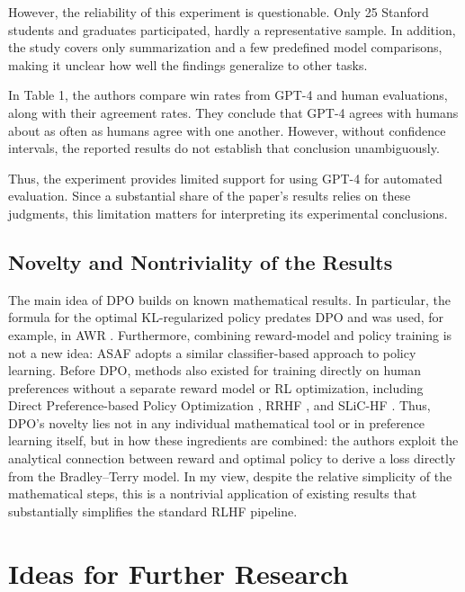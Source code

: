 \documentclass[11pt,a4paper]{article}
\theoremstyle{remark}
\begin{document}
However, the reliability of this experiment is questionable. Only 25 Stanford students and graduates participated, hardly a representative sample. In addition, the study covers only summarization and a few predefined model comparisons, making it unclear how well the findings generalize to other tasks.

In Table 1, the authors compare win rates from GPT-4 and human evaluations, along with their agreement rates. They conclude that GPT-4 agrees with humans about as often as humans agree with one another. However, without confidence intervals, the reported results do not establish that conclusion unambiguously.

Thus, the experiment provides limited support for using GPT-4 for automated evaluation. Since a substantial share of the paper's results relies on these judgments, this limitation matters for interpreting its experimental conclusions.

\subsection{Novelty and Nontriviality of the Results}

The main idea of DPO builds on known mathematical results. In particular, the formula for the optimal KL-regularized policy predates DPO and was used, for example, in AWR \cite{awr}. Furthermore, combining reward-model and policy training is not a new idea: ASAF \cite{asaf} adopts a similar classifier-based approach to policy learning. Before DPO, methods also existed for training directly on human preferences without a separate reward model or RL optimization, including Direct Preference-based Policy Optimization \cite{an2023}, RRHF \cite{rrhf}, and SLiC-HF \cite{slic-hf}. Thus, DPO's novelty lies not in any individual mathematical tool or in preference learning itself, but in how these ingredients are combined: the authors exploit the analytical connection between reward and optimal policy to derive a loss directly from the Bradley--Terry model. In my view, despite the relative simplicity of the mathematical steps, this is a nontrivial application of existing results that substantially simplifies the standard RLHF pipeline.

\section{Ideas for Further Research}
\end{document}

